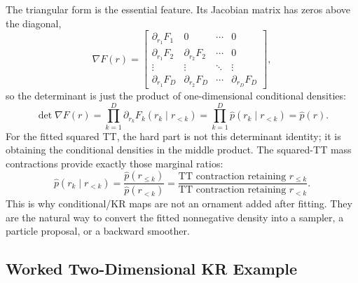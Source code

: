 \documentclass[11pt]{article}
\numberwithin{equation}{section}
\begin{document}
The triangular form is the essential feature.  Its Jacobian matrix has zeros
above the diagonal,
\begin{equation}
    \nabla F(r)
    =
    \begin{bmatrix}
    \partial_{r_1}F_1 & 0 & \cdots & 0\\
    \partial_{r_1}F_2 & \partial_{r_2}F_2 & \cdots & 0\\
    \vdots & \vdots & \ddots & \vdots\\
    \partial_{r_1}F_D & \partial_{r_2}F_D & \cdots &
    \partial_{r_D}F_D
    \end{bmatrix},
    \label{eq:p26-kr-teach-5}
\end{equation}
so the determinant is just the product of one-dimensional conditional
densities:
\begin{equation}
    \det\nabla F(r)
    =
    \prod_{k=1}^D
    \partial_{r_k}F_k(r_k\mid r_{<k})
    =
    \prod_{k=1}^D
    \widehat p(r_k\mid r_{<k})
    =
    \widehat p(r).
    \label{eq:p26-kr-teach-6}
\end{equation}
For the fitted squared TT, the hard part is not this determinant identity; it
is obtaining the conditional densities in the middle product.  The squared-TT
mass contractions provide exactly those marginal ratios:
\begin{equation}
    \widehat p(r_k\mid r_{<k})
    =
    \frac{\widehat p(r_{\le k})}{\widehat p(r_{<k})}
    =
    \frac{\text{TT contraction retaining }r_{\le k}}
         {\text{TT contraction retaining }r_{<k}}.
    \label{eq:p26-kr-teach-7}
\end{equation}
This is why conditional/KR maps are not an ornament added after fitting.  They
are the natural way to convert the fitted nonnegative density into a sampler,
a particle proposal, or a backward smoother.

\subsection*{Worked Two-Dimensional KR Example}
\end{document}
